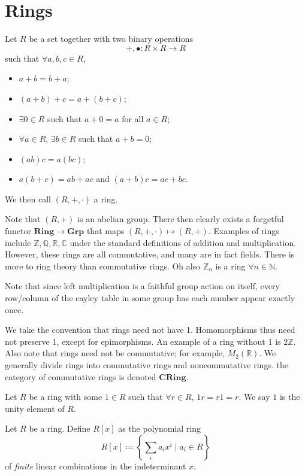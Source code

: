 \chapter{Rings}
\begin{definition}[Ring]\label{dfn:1.1}
	Let $R$ be a set together with two binary operations
	\[
		+,\bullet : R\times R \to R
	\]
	such that $\forall a,b,c\in R$,
	\begin{itemize}
		\item $a+b=b+a $;
		\item $(a+b)+c=a+(b+c)$;
		\item $\exists 0\in R$ such that $a+0=a$ for all  $a\in R$;
		\item $\forall a\in R$, $\exists b\in R$ such that $a+b=0$;
		\item $(ab)c=a(bc)$;
		\item $a(b+c)=ab+ac$ and $(a+b)c=ac+bc$.
	\end{itemize}
	We then call $(R,+,\cdot )$ a ring.
\end{definition}

Note that $(R,+)$ is an abelian group. There then clearly exists a forgetful functor $\mathbf{Ring}\to \mathbf{Grp}$ that maps $(R,+,\cdot )\mapsto (R,+)$. Examples of rings include $\mathbb{Z},\mathbb{Q},\mathbb{R},\mathbb{C}$ under the standard definitions of addition and multiplication. However, these rings are all commutative, and many are in fact fields. There is more to ring theory than commutative rings. Oh also $\mathbb{Z}_n$ is a ring $\forall n\in\mathbb{N}$.

Note that since left multiplication is a faithful group action on itself, every row/column of the cayley table in some group has each number appear exactly once.

We take the convention that rings need not have 1. Homomorphisms thus need not preserve 1, except for epimorphisms. An example of a ring without 1 is $2\mathbb{Z}$. Also note that rings need not be commutative; for example, $M_2(\mathbb{R})$. We generally divide rings into commutative rings and noncommutative rings. the category of commutative rings is denoted $\mathbf{CRing}$.

\begin{definition}[Unity]\label{dfn:1.2}
	Let $R$ be a ring with some $1\in R$ such that $\forall r\in R$, $1r=r1=r$. We say $1$ is the unity element of $R$.
\end{definition}
\begin{definition}\label{dfn:1.3}
	Let $R$ be a ring. Define  $R[x]$ as the polynomial ring
	\[
		R[x]\coloneqq \left\{ \sum_{i} a_ix^i  \mid a_i\in R \right\} 
	\]
	of \emph{finite} linear combinations in the indeterminant $x$.
\end{definition}
